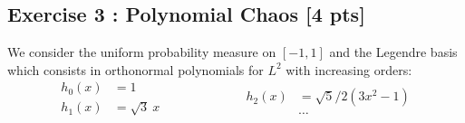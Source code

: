 \documentclass[a4paper,10pt]{article}
\begin{document}
\subsection*{Exercise 3 : Polynomial Chaos \hfill [4 pts]}
We consider the uniform probability measure on $[-1,1]$ and the Legendre basis which consists in orthonormal polynomials for $L^2$ with increasing orders:
\begin{equation*}
  \begin{split}
    h_{0}(x) & = 1 \\
    h_{1}(x) & = \sqrt{3}\ x \\
  \end{split}
  \qquad \qquad \qquad 
  \begin{split}
    h_{2}(x) & = \sqrt{5}/2 (3x^2 -1) \\
     & \dots 
  \end{split}
\end{equation*}
\end{document}
